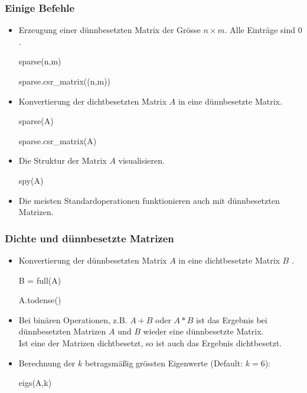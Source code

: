 \documentclass[hyperref={xetex}]{beamer}
\begin{document}
\begin{frame}[fragile]\frametitle{Einige Befehle}
\begin{itemize}
\item Erzeugung einer d\"unnbesetzten Matrix
  der Gr\"osse $n \times m$. Alle Eintr\"age sind $0$.
\begin{matlabin}
sparse(n,m) 
\end{matlabin}
\begin{pyin}
sparse.csr_matrix((n,m))
\end{pyin}

\item Konvertierung der dichtbesetzten Matrix
  $A$ in eine d\"unnbesetzte Matrix.
\begin{matlabin}
sparse(A)
\end{matlabin}
\begin{pyin}
sparse.csr_matrix(A)
\end{pyin}

\item Die Struktur der Matrix $A$ visualisieren.
\begin{matlabin}
spy(A)
\end{matlabin}

\item Die meisten Standardoperationen funktionieren auch mit
  d\"unnbesetzten Matrizen.  
\end{itemize}
\end{frame}
% 
%
\begin{frame}[fragile]\frametitle{Dichte und d\"unnbesetzte Matrizen}
\begin{itemize}
\item Konvertierung der d\"unnbesetzten Matrix $A$ in eine dichtbesetzte Matrix $B$ .
\begin{matlabin}
B = full(A)
\end{matlabin}
\begin{pyin}
A.todense()  
\end{pyin}
\item Bei bin\"aren Operationen, z.B. $A+B$ oder $A*B$ ist das Ergebnis
  bei d\"unnbesetzten Matrizen $A$ und $B$ wieder eine d\"unnbesetzte
  Matrix. \\Ist eine der Matrizen dichtbesetzt, so ist auch das Ergebnis
  dichtbesetzt. 
\item Berechnung der $k$ betragsm\"a{\ss}ig  gr\"ossten Eigenwerte (Default: $k=6$):
\begin{matlabin}
eigs(A,k) 
\end{matlabin}

\end{itemize}
\end{frame}
\end{document}
